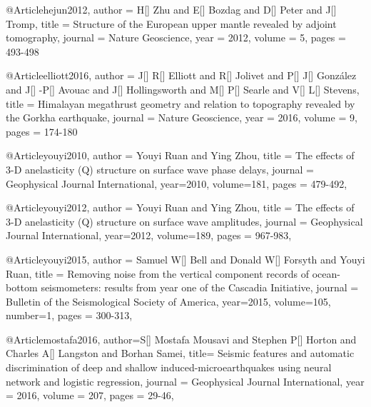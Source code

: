 @Article{hejun2012,
  author = 	 {H[] Zhu and E[] Bozdag and D[] Peter and J[] Tromp},
  title = 	 {Structure of the European upper mantle revealed by adjoint tomography},
  journal = 	 {Nature Geoscience},
  year = 	 2012,
  volume = 5,
  pages =	 {493-498}
}

@Article{elliott2016,
  author = 	 {J[] R[] Elliott and R[] Jolivet and P[] J[] Gonz\'{a}lez and J[] -P[] Avouac and J[] Hollingsworth and M[] P[] Searle and V[] L[] Stevens},
  title = 	 {Himalayan megathrust geometry and relation to topography revealed by the {G}orkha earthquake},
  journal = 	 {Nature Geoscience},
  year = 	 2016,
  volume = 9,
  pages =	 {174-180}
}

@Article{youyi2010,
  author =	 {Youyi Ruan and Ying Zhou},
  title =	 {The effects of 3-D anelasticity (Q) structure on surface wave phase delays},
  journal =	 {Geophysical Journal International},
  year=2010,
  volume=181,
  pages =	 {479-492},
}

@Article{youyi2012,
  author =	 {Youyi Ruan and Ying Zhou},
  title =	 {The effects of 3-D anelasticity (Q) structure on surface wave amplitudes},
  journal =	 {Geophysical Journal International},
  year=2012,
  volume=189,
  pages =	 {967-983},
}

@Article{youyi2015,
  author =	 {Samuel W[] Bell and Donald W[] Forsyth and Youyi Ruan},
  title =	 {Removing noise from the vertical component records of ocean-bottom seismometers: results from year one of the Cascadia Initiative},
  journal =	 {Bulletin of the Seismological Society of America},
  year=2015,
  volume=105,
  number=1,
  pages =	 {300-313},
}


@Article{mostafa2016,
  author={S[] Mostafa Mousavi and Stephen P[] Horton and Charles A[] Langston and Borhan Samei},
  title={ Seismic features and automatic discrimination of deep and shallow induced-microearthquakes using neural network and logistic regression},
  journal = 	 {Geophysical Journal International},
  year = 	 2016,
  volume =	 207,
  pages =	 {29-46},
}



